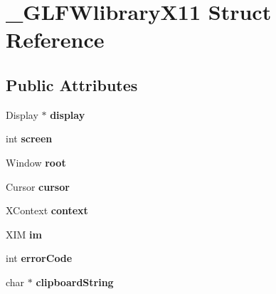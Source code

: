 \hypertarget{struct__GLFWlibraryX11}{}\section{\+\_\+\+G\+L\+F\+Wlibrary\+X11 Struct Reference}
\label{struct__GLFWlibraryX11}
\subsection*{Public Attributes}
\begin{DoxyCompactItemize}
\item 
\hypertarget{struct__GLFWlibraryX11_af0aa2a7965bf19cad26853dbee101aa5}{}Display $\ast$ {\bfseries display}\label{struct__GLFWlibraryX11_af0aa2a7965bf19cad26853dbee101aa5}

\item 
\hypertarget{struct__GLFWlibraryX11_a4fffc59e1bb20e819f31975408ad1c14}{}int {\bfseries screen}\label{struct__GLFWlibraryX11_a4fffc59e1bb20e819f31975408ad1c14}

\item 
\hypertarget{struct__GLFWlibraryX11_a6b8934bb9537dd8908d6746d65ec439c}{}Window {\bfseries root}\label{struct__GLFWlibraryX11_a6b8934bb9537dd8908d6746d65ec439c}

\item 
\hypertarget{struct__GLFWlibraryX11_a6dc2c7decee6e07891471b3cea3d4e4a}{}Cursor {\bfseries cursor}\label{struct__GLFWlibraryX11_a6dc2c7decee6e07891471b3cea3d4e4a}

\item 
\hypertarget{struct__GLFWlibraryX11_ac4e38d2fcb14f07705c6890672a59a80}{}X\+Context {\bfseries context}\label{struct__GLFWlibraryX11_ac4e38d2fcb14f07705c6890672a59a80}

\item 
\hypertarget{struct__GLFWlibraryX11_a52a869c4a5a948955eabe08d525085cd}{}X\+I\+M {\bfseries im}\label{struct__GLFWlibraryX11_a52a869c4a5a948955eabe08d525085cd}

\item 
\hypertarget{struct__GLFWlibraryX11_a46fadcaae0566e058110cd1cc46ddab8}{}int {\bfseries error\+Code}\label{struct__GLFWlibraryX11_a46fadcaae0566e058110cd1cc46ddab8}

\item 
\hypertarget{struct__GLFWlibraryX11_acb4673b85d59e095a8658623ad487071}{}char $\ast$ {\bfseries clipboard\+String}\label{struct__GLFWlibraryX11_acb4673b85d59e095a8658623ad487071}


\end{DoxyCompactItemize}
